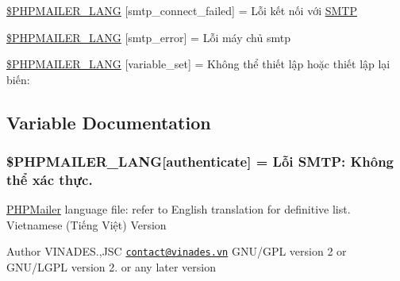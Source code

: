 \begin{DoxyCompactItemize}
\item 
\hyperlink{phpmailer_8lang-vi_8php_a7b321d4ca1e9df702403ed4c61aa0980}{\$\+P\+H\+P\+M\+A\+I\+L\+E\+R\+\_\+\+L\+A\+NG} \mbox{[}\textquotesingle{}smtp\+\_\+connect\+\_\+failed\textquotesingle{}\mbox{]} = \textquotesingle{}Lỗi kết nối với \hyperlink{class_s_m_t_p}{S\+M\+TP}\textquotesingle{}
\item 
\hyperlink{phpmailer_8lang-vi_8php_a7d9cffba1e669c845f8a4c891ee50064}{\$\+P\+H\+P\+M\+A\+I\+L\+E\+R\+\_\+\+L\+A\+NG} \mbox{[}\textquotesingle{}smtp\+\_\+error\textquotesingle{}\mbox{]} = \textquotesingle{}Lỗi máy chủ smtp \textquotesingle{}
\item 
\hyperlink{phpmailer_8lang-vi_8php_af795debc7a739d038742691c358d9032}{\$\+P\+H\+P\+M\+A\+I\+L\+E\+R\+\_\+\+L\+A\+NG} \mbox{[}\textquotesingle{}variable\+\_\+set\textquotesingle{}\mbox{]} = \textquotesingle{}Không thể thiết lập hoặc thiết lập lại biến\+: \textquotesingle{}
\end{DoxyCompactItemize}


\subsection{Variable Documentation}
\subsubsection[{\texorpdfstring{\$\+P\+H\+P\+M\+A\+I\+L\+E\+R\+\_\+\+L\+A\+NG}{$PHPMAILER_LANG}}]{\setlength{\rightskip}{0pt plus 5cm}\$P\+H\+P\+M\+A\+I\+L\+E\+R\+\_\+\+L\+A\+NG\mbox{[}\textquotesingle{}authenticate\textquotesingle{}\mbox{]} = \textquotesingle{}Lỗi S\+M\+T\+P\+: Không thể xác thực.\textquotesingle{}}\hypertarget{phpmailer_8lang-vi_8php_a2cb33073c989b85580748e331ed8b4aa}{}\label{phpmailer_8lang-vi_8php_a2cb33073c989b85580748e331ed8b4aa}
\hyperlink{class_p_h_p_mailer}{P\+H\+P\+Mailer} language file\+: refer to English translation for definitive list. Vietnamese (Tiếng Việt) Version \begin{DoxyAuthor}{Author}
V\+I\+N\+A\+D\+ES.,J\+SC \href{mailto:contact@vinades.vn}{\tt contact@vinades.\+vn}  G\+N\+U/\+G\+PL version 2 or G\+N\+U/\+L\+G\+PL version 2. or any later version 
\end{DoxyAuthor}


